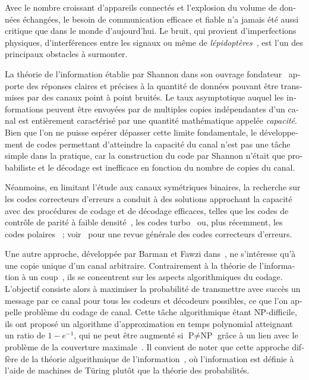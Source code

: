\begin{otherlanguage}{french}
Avec le nombre croissant d'appareils connectés et l'explosion du volume de données échangées, le besoin de communication efficace et fiable n'a jamais été aussi critique que dans le monde d'aujourd'hui. Le bruit, qui provient d'imperfections physiques, d'interférences entre les signaux ou même de \emph{lépidoptères}~\cite{Hopper81}, est l'un des principaux obstacles à surmonter.

La théorie de l'information établie par Shannon dans son ouvrage fondateur~\cite{Shannon48} apporte des réponses claires et précises à la quantité de données pouvant être transmises par des canaux point à point bruités. Le taux asymptotique auquel les informations peuvent être envoyées par de multiples copies indépendantes d'un canal est entièrement caractérisé par une quantité mathématique appelée \emph{capacité}. Bien que l'on ne puisse espérer dépasser cette limite fondamentale, le développement de codes permettant d'atteindre la capacité du canal n'est pas une tâche simple dans la pratique, car la construction du code par Shannon n'était que probabiliste et le décodage est inefficace en fonction du nombre de copies du canal.

Néanmoins, en limitant l'étude aux canaux symétriques binaires, la recherche sur les codes correcteurs d'erreurs a conduit à des solutions approchant la capacité avec des procédures de codage et de décodage efficaces, telles que les codes de contrôle de parité à faible densité~\cite{Gallager62}, les codes turbo~\cite{BG96} ou, plus récemment, les codes polaires~\cite{Arikan09} ; voir~\cite{RU08} pour une revue générale des codes correcteurs d'erreurs.

Une autre approche, développée par Barman et Fawzi dans~\cite{BF18}, ne s'intéresse qu'à une copie unique d'un canal arbitraire. Contrairement à la théorie de l'information à un coup~\cite{RWW06,Tomamichel12}, ils se concentrent sur les aspects algorithmiques du codage. L'objectif consiste alors à maximiser la probabilité de transmettre avec succès un message par ce canal pour tous les codeurs et décodeurs possibles, ce que l'on appelle problème du codage de canal. Cette tâche algorithmique étant \textrm{NP}-difficile, ils ont proposé un algorithme d'approximation en temps polynomial atteignant un ratio de $1-e^{-1}$, qui ne peut être augmenté si $\textrm{P}\not=\textrm{NP}$ grâce à un lien avec le problème de la couverture maximale~\cite{Feige98}. Il convient de noter que cette approche diffère de la théorie algorithmique de l'information~\cite{Chaitin77}, où l'information est définie à l'aide de machines de Türing plutôt que la théorie des probabilités.


\end{otherlanguage}
